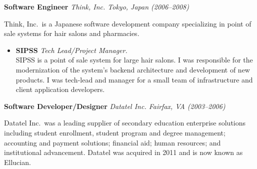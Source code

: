 \documentclass{article}
\begin{document}
\begin{list}{}{
    \setlength{\leftmargin}{0cm}	%
    \setlength{\parsep}{0.15cm}
}
\begin{itemize}
\begin{itemize}
        \end{itemize}

    \end{itemize}

    \pagebreak

    \item \textbf{\large Software Engineer} \emph{Think, Inc. Tokyo, Japan
        (2006--2008)}

    Think, Inc.\ is a Japanese software development company specializing in point
    of sale systems for hair salons and pharmacies.

    \begin{itemize}

        \item \textbf{SIPSS} \emph{Tech Lead/Project Manager.}\\
            SIPSS is a point of sale system for large hair salons. I was
            responsible for the modernization of the system's backend
            architecture and development of new products. I was tech-lead and
            manager for a small team of infrastructure and client application
            developers.


    \end{itemize}

    \item \textbf{\large Software Developer/Designer} \emph{Datatel Inc.
        Fairfax, VA (2003--2006)}

    Datatel Inc.\ was a leading supplier of secondary education enterprise
    solutions including student enrollment, student program and degree
    management; accounting and payment solutions; financial aid; human
    resources; and institutional advancement. Datatel was acquired in
    2011 and is now known as Ellucian.


\end{list}
\end{document}

